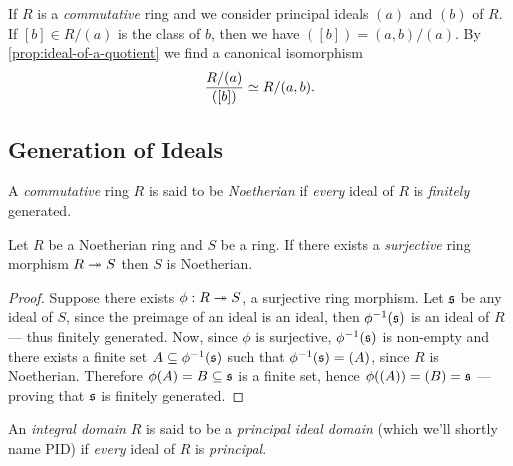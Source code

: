 \begin{example}
\label{exp:principal-ideals-and-ideals-of-a-quotient}
If \(R\) is a \emph{commutative} ring and we consider principal ideals \((a)\)
and \((b)\) of \(R\). If \([b] \in R/(a)\) is the class of \(b\), then we have
\(([b]) = (a, b) / (a)\). By \cref{prop:ideal-of-a-quotient} we find a
canonical isomorphism
\[
\frac{R/(a)}{([b])} \simeq R/(a, b).
\]
\end{example}

\subsection{Generation of Ideals}

\begin{definition}
\label{def:noetherian-ring}
A \emph{commutative} ring \(R\) is said to be \emph{Noetherian} if \emph{every}
ideal of \(R\) is \emph{finitely} generated.
\end{definition}

\begin{proposition}
\label{prop:image-of-noetherian-is-noetherian}
Let \(R\) be a Noetherian ring and \(S\) be a ring. If there exists a
\emph{surjective} ring morphism \(R \twoheadrightarrow S\) then \(S\) is Noetherian.
\end{proposition}

\begin{proof}
Suppose there exists \(\phi: R \twoheadrightarrow S\), a surjective ring morphism. Let
\(\mathfrak{s}\) be any ideal of \(S\), since the preimage of an ideal is an ideal,
then \(\phi^{-1}(\mathfrak{s})\) is an ideal of \(R\) --- thus finitely
generated. Now, since \(\phi\) is surjective, \(\phi^{-1}(\mathfrak{s})\) is
non-empty and there exists a finite set \(A \subseteq \phi^{-1}(\mathfrak{s})\)
such that \(\phi^{-1}(\mathfrak{s}) = (A)\), since \(R\) is Noetherian. Therefore
\(\phi(A) = B \subseteq \mathfrak{s}\) is a finite set, hence
\(\phi((A)) = (B) = \mathfrak{s}\) --- proving that \(\mathfrak{s}\) is finitely
generated.
\end{proof}

\begin{definition}
\label{def:PID}
An \emph{integral domain} \(R\) is said to be a \emph{principal ideal domain}
(which we'll shortly name PID) if \emph{every} ideal of \(R\) is
\emph{principal}.
\end{definition}

